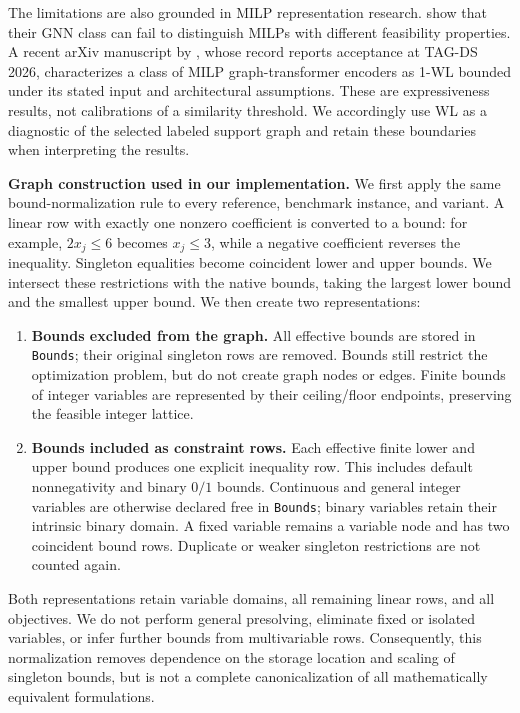 \documentclass[10pt]{article}
\begin{document}
The limitations are also grounded in MILP representation research.
\citet{Chen2023} show that their GNN class can fail to distinguish MILPs
with different feasibility properties. A recent arXiv manuscript by
\citet{Jahin2026}, whose record reports acceptance at TAG-DS 2026,
characterizes a class of MILP graph-transformer encoders as 1-WL bounded
under its stated input and architectural assumptions. These are
expressiveness results, not calibrations of a similarity threshold.
We accordingly use WL as a diagnostic of the selected labeled support
graph and retain these boundaries when interpreting the results.

\medskip
\textbf{Graph construction used in our implementation.}
We first apply the same bound-normalization rule to every reference,
benchmark instance, and variant. A linear row with exactly one nonzero
coefficient is converted to a bound: for example, $2x_j\leq6$ becomes
$x_j\leq3$, while a negative coefficient reverses the inequality.
Singleton equalities become coincident lower and upper bounds.
We intersect these restrictions with the native bounds, taking the
largest lower bound and the smallest upper bound. We then create two
representations:
\begin{enumerate}
\item \textbf{Bounds excluded from the graph.}
All effective bounds are stored in \texttt{Bounds}; their original
singleton rows are removed. Bounds still restrict the optimization
problem, but do not create graph nodes or edges. Finite bounds of integer
variables are represented by their ceiling/floor endpoints, preserving
the feasible integer lattice.
\item \textbf{Bounds included as constraint rows.}
Each effective finite lower and upper bound produces one explicit
inequality row. This includes default nonnegativity and binary $0/1$
bounds. Continuous and general integer variables are otherwise declared
free in \texttt{Bounds}; binary variables retain their intrinsic binary
domain. A fixed variable remains a variable node and has two coincident
bound rows. Duplicate or weaker singleton restrictions are not counted
again.
\end{enumerate}
Both representations retain variable domains, all remaining linear rows,
and all objectives. We do not perform general presolving, eliminate fixed
or isolated variables, or infer further bounds from multivariable rows.
Consequently, this normalization removes dependence on the storage
location and scaling of singleton bounds, but is not a complete
canonicalization of all mathematically equivalent formulations.
\end{document}
